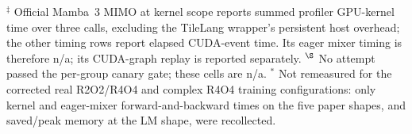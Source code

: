 \par\smallskip
\noindent\begin{minipage}{\linewidth}\footnotesize
$^\ddagger$ Official Mamba~3 MIMO at kernel scope reports summed profiler GPU-kernel
time over three calls, excluding the TileLang wrapper's persistent host overhead;
the other timing rows report elapsed CUDA-event time. Its eager mixer timing is
therefore n/a; its CUDA-graph replay is reported separately.
$^\S$ No attempt passed the per-group canary gate; these cells are n/a.
$^\ast$ Not remeasured for the corrected real R2O2/R4O4 and complex R4O4 training configurations:
only kernel and eager-mixer forward-and-backward times on the five paper shapes,
and saved/peak memory at the LM shape, were recollected.
\end{minipage}
